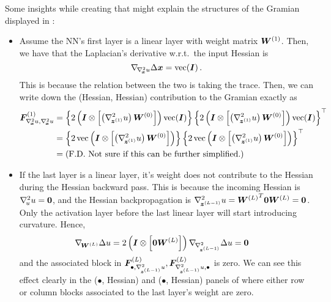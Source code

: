 Some insights while creating  that might explain the structures of the Gramian displayed in :
\begin{itemize}
\item Assume the NN's first layer is a linear layer with weight matrix ${\bm{W}}^{(1)}$.
  Then, we have that the Laplacian's derivative w.r.t.\, the input Hessian is
  \begin{equation*}
    \nabla_{\!{\nabla_{\!{{\bm{x}}}}^{2}u}}\Delta {\bm{x}} = \operatorname{vec}({\bm{I}})\,.
  \end{equation*}
  This is because the relation between the two is taking the trace.
  Then, we can write down the (Hessian, Hessian) contribution to the Gramian
  exactly as
  \begin{align*}
    {\bm{F}}^{(1)}_{\nabla_{\!{{\bm{x}}}}^{2}u, \nabla_{\!{{\bm{x}}}}^{2}u}
    &=
      \left\{
      2
      \left(
      {\bm{I}} \otimes
      \left[
      \left( \nabla_{\!{{\bm{z}}^{(1)}}}^{2}u \right) {\bm{W}}^{(0)}
      \right]
      \right)
      \operatorname{vec}({\bm{I}})
      \right\}
      \left\{
      2
      \left(
      {\bm{I}} \otimes
      \left[
      \left( \nabla_{\!{{\bm{z}}^{(1)}}}^{2}u \right) {\bm{W}}^{(0)}
      \right]
      \right)
      \operatorname{vec}({\bm{I}})
      \right\}^{\top}
    \\
    &=
      \left\{
      2
      \operatorname{vec}
      \left(
      {\bm{I}} \otimes
      \left[
      \left( \nabla_{\!{{\bm{z}}^{(1)}}}^{2}u \right) {\bm{W}}^{(0)}
      \right]
      \right)
      \right\}
      \left\{
      2
      \operatorname{vec}
      \left(
      {\bm{I}} \otimes
      \left[
      \left( \nabla_{\!{{\bm{z}}^{(1)}}}^{2}u \right) {\bm{W}}^{(0)}
      \right]
      \right)
      \right\}^{\top}
    \\
    &=
      \text{(F.D. Not sure if this can be further simplified.)}
  \end{align*}

\item If the last layer is a linear layer, it's weight does not contribute to the Hessian during the Hessian backward pass.
  This is because the incoming Hessian is $\nabla_{\!{u}}^{2}u = {\bm{0}}$, and the Hessian backpropagation is $\nabla_{\!{{\bm{z}}^{(L-1)}}}^{2}u = {{\bm{W}}^{(L)}}^T{\bm{0}} {\bm{W}}^{(L)} = {\bm{0}}$.
  Only the activation layer before the last linear layer will start introducing curvature.
  Hence,
  \begin{align*}
    \nabla_{\!{{\bm{W}}^{(L)}}} \Delta u
    &=
      2
      \left(
      {\bm{I}} \otimes
      \left[
      {\bm{0}} {\bm{W}}^{(L)}
      \right]
      \right)
      \nabla_{\!{\nabla_{\!{{\bm{z}}^{(L-1)}}}^{2}}} \Delta u
      =
      {\bm{0}}
  \end{align*}
  and the associated block in $ {\bm{F}}^{(L)}_{\bullet, \nabla_{\!{{\bm{z}}^{(L-1)}}}^{2}u}, {\bm{F}}^{(L)}_{\nabla_{\!{{\bm{z}}^{(L-1)}}}^{2}u, \bullet} $ is zero.
  We can see this effect clearly in the ($\bullet$, Hessian) and ($\bullet$, Hessian) panels of  where either row or column blocks associated to the last layer's weight are zero.


\end{itemize}
